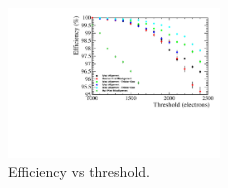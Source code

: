 \begin{figure}
\centering
\includegraphics[width=0.5\textwidth]{CLICdpVertex/Plots/ZoomedEfficiency.pdf}
\caption[Efficiency vs threshold.]{Efficiency vs threshold.}
\label{fig:efficiency}
\end{figure}




  
